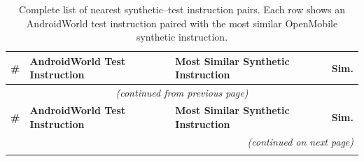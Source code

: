 \documentclass{article} %
\begin{document}
\begin{scriptsize}
\setlength{\tabcolsep}{3pt}
\begin{longtable}{@{} c >{\raggedright\arraybackslash}p{} >{\raggedright\arraybackslash}p{} c @{}}
\caption{Complete list of nearest synthetic--test instruction pairs. Each row shows an AndroidWorld test instruction paired with the most similar OpenMobile synthetic instruction.}
\label{tab:overlap_full} \\
\toprule
\textbf{\#} & \textbf{AndroidWorld Test Instruction} & \textbf{Most Similar Synthetic Instruction} & \textbf{Sim.} \\
\midrule
\endfirsthead

\multicolumn{4}{c}{\scriptsize\itshape (continued from previous page)} \\[0.5ex]
\toprule
\textbf{\#} & \textbf{AndroidWorld Test Instruction} & \textbf{Most Similar Synthetic Instruction} & \textbf{Sim.} \\
\midrule
\endhead

\midrule
\multicolumn{4}{r}{\scriptsize\itshape (continued on next page)} \\
\endfoot

\bottomrule
\endlastfoot


\end{longtable}
\end{scriptsize}
\end{document}
